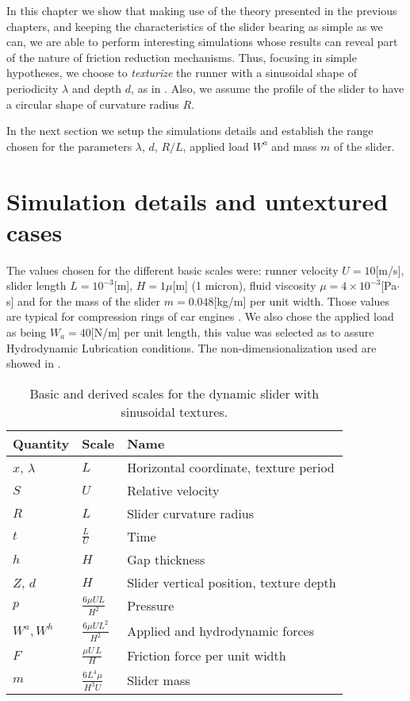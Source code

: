 In this chapter we show that making use of the theory presented in the previous chapters, and keeping the characteristics of the slider bearing as simple as we can, we are able to perform interesting simulations whose results can reveal part of the nature of friction reduction mechanisms. Thus, focusing in simple hypotheses, we choose to \emph{texturize} the runner with a sinusoidal shape of periodicity $\lambda$ and depth $d$, as in . Also, we assume the profile of the slider to have a circular shape of curvature radius $R$.

In the next section we setup the simulations details and establish the range chosen for the parameters $\lambda$, $d$, $R/L$, applied load $W^a$ and mass $m$ of the slider. 

\section{Simulation details and untextured cases}\label{sec:chap6_sim_details}
The values chosen for the different basic scales were: runner velocity $U=10$[m/s], slider length $L=10^{-3}$[m], $H=1\mu$[m] (1 micron), fluid viscosity $\mu=4\times 10^{-3}$[Pa$\cdot$s] and for the mass of the slider $m=0.048$[kg/m] per unit width. Those values are typical for compression rings of car engines \cite{checo2014b,gadeshi2012}. We also chose the applied load as being $W_a=40$[N/m] per unit length, this value was selected as to assure Hydrodynamic Lubrication conditions. The non-dimensionalization used are showed in .

\begin{table}[ht]
\centering
\begin{tabular}{lll}
\toprule
Quantity & Scale & Name\\ \midrule
$x$, $\lambda$ & ${L}$ & Horizontal coordinate, texture period\\
%
$S$ & ${U}$ & Relative velocity\\
%
$R$ & $L$ & Slider curvature radius \\
%
$t$ & $\frac{L}{U}$ & Time\\
%
$h$ & $H$ & Gap thickness\\
%
$Z$, $d$ & $H$ & Slider vertical position, texture depth\\
%
$p$ & $\frac{6\mu U L}{H^2}$ & Pressure\\
%
$W^{a}, W^h$ & $\frac{6\mu U L^2}{H^2}$ & Applied and hydrodynamic forces\\
%
$F$ & $\frac{\mu U\,L}{H}$ & Friction force per unit width\\
%
$m$ & $\frac{6 L^4 \mu}{H^3 U}$ & Slider mass \\ \bottomrule
\end{tabular}
\caption{Basic and derived scales for the dynamic slider with sinusoidal textures.}\label{tab:slider_scales}
\end{table}

